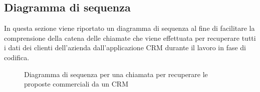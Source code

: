 \subsection{Diagramma di sequenza}
In questa sezione viene riportato un diagramma di sequenza  al fine di facilitare la comprensione della catena delle chiamate che viene effettuata per recuperare tutti i dati dei clienti dell'azienda dall'applicazione CRM durante il lavoro in fase di codifica.
	\begin{figure}[H]
	\centering
	
	\caption{Diagramma di sequenza per una chiamata per recuperare le proposte commerciali da un CRM }
	\label{fig:sdProposals}
\end{figure}

